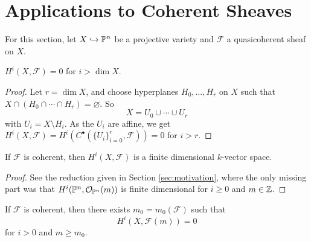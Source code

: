 \section{Applications to Coherent Sheaves}

\begin{remark}
  For this section, let
  $X \hookrightarrow \mathbb{P}^n$ be a projective
  variety and $\mathcal{F}$ a
  quasicoherent sheaf on $X$.
\end{remark}

\begin{prop}
  $H^i(X, \mathcal{F}) = 0$ for
  $i > \dim X$.
\end{prop}

\begin{proof}
  Let $r = \dim X$, and choose
  hyperplanes $H_0, \dots, H_r$ on
  $X$ such that
  $X \cap (H_0 \cap \cdots \cap H_r) = \varnothing$.
  So
  \[
    X = U_0 \cup \cdots \cup U_r
  \]
  with $U_i = X \setminus H_i$. As the
  $U_i$ are affine, we get
  $H^i(X, \mathcal{F})
    = H^i(C^\bullet(\{U_i\}_{i = 0}^r, \mathcal{F}))
    = 0$
  for $i > r$.
\end{proof}

\begin{prop}
  If $\mathcal{F}$ is coherent,
  then $H^i(X, \mathcal{F})$ is a
  finite dimensional $k$-vector space.
\end{prop}

\begin{proof}
  See the reduction given in Section
  \ref{sec:motivation}, where the only
  missing part was that
  $H^i(\mathbb{P}^n, \mathcal{O}_{\mathbb{P}^n}(m))$
  is finite dimensional for $i \ge 0$ and
  $m \in \mathbb{Z}$.
\end{proof}

\begin{theorem}\label{thm:serre-vanishing}
  If $\mathcal{F}$ is coherent, then
  there exists $m_0 = m_0(\mathcal{F})$
  such that
  \[
    H^i(X, \mathcal{F}(m))
    = 0
  \]
  for $i > 0$ and $m \ge m_0$.
\end{theorem}

